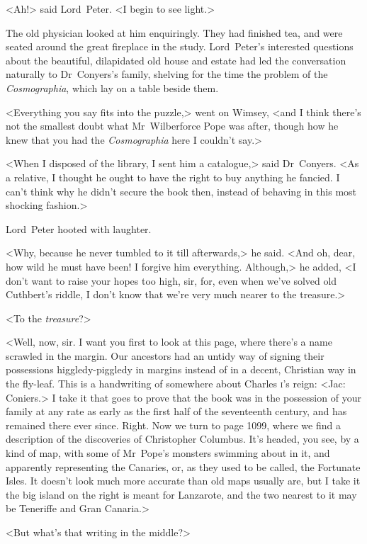 <Ah!> said Lord~Peter. <I begin to see light.>

The old physician looked at him enquiringly. They had finished tea, and were seated around the great fireplace in the study. Lord~Peter's interested questions about the beautiful, dilapidated old house and estate had led the conversation naturally to Dr~Conyers's family, shelving for the time the problem of the \textit{Cosmographia}, which lay on a table beside them.

<Everything you say fits into the puzzle,> went on Wimsey, <and I think there's not the smallest doubt what Mr~Wilberforce Pope was after, though how he knew that you had the \textit{Cosmographia} here I couldn't say.>

<When I disposed of the library, I sent him a catalogue,> said Dr~Conyers. <As a relative, I thought he ought to have the right to buy anything he fancied. I can't think why he didn't secure the book then, instead of behaving in this most shocking fashion.>

Lord~Peter hooted with laughter.

<Why, because he never tumbled to it till afterwards,> he said. <And oh, dear, how wild he must have been! I forgive him everything. Although,> he added, <I don't want to raise your hopes too high, sir, for, even when we've solved old Cuthbert's riddle, I don't know that we're very much nearer to the treasure.>

<To the \textit{treasure}?>

<Well, now, sir. I want you first to look at this page, where there's a name scrawled in the margin. Our ancestors had an untidy way of signing their possessions higgledy-piggledy in margins instead of in a decent, Christian way in the fly-leaf. This is a handwriting of somewhere about Charles \textsc{i}'s reign: <Jac: Coniers.> I take it that goes to prove that the book was in the possession of your family at any rate as early as the first half of the seventeenth century, and has remained there ever since. Right. Now we turn to page 1099, where we find a description of the discoveries of Christopher Columbus. It's headed, you see, by a kind of map, with some of Mr~Pope's monsters swimming about in it, and apparently representing the Canaries, or, as they used to be called, the Fortunate Isles. It doesn't look much more accurate than old maps usually are, but I take it the big island on the right is meant for Lanzarote, and the two nearest to it may be Teneriffe and Gran Canaria.>

<But what's that writing in the middle?>

